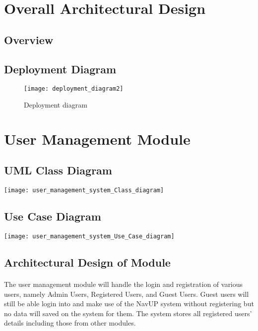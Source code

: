 \documentclass{article}
\begin{document}
\section{Overall Architectural Design}
\subsection{Overview}
\subsection{Deployment Diagram}

\pagebreak
\begin{figure}
\texttt{[image: deployment\_diagram2]}
\caption{Deployment diagram}
\end{figure}

\section{User Management Module}

\subsection{UML Class Diagram}
\texttt{[image: user\_management\_system\_Class\_diagram]}


\subsection{Use Case Diagram}

\texttt{[image: user\_management\_system\_Use\_Case\_diagram]}

\subsection{Architectural Design of Module}
\paragraph{}The user management module will handle the login and registration of various users, namely Admin Users, Registered Users, and Guest Users. Guest users will still be able login into and make use of the NavUP system without registering but no data will saved on the system for them. The system stores all registered users' details including those from other modules.
\end{document}
